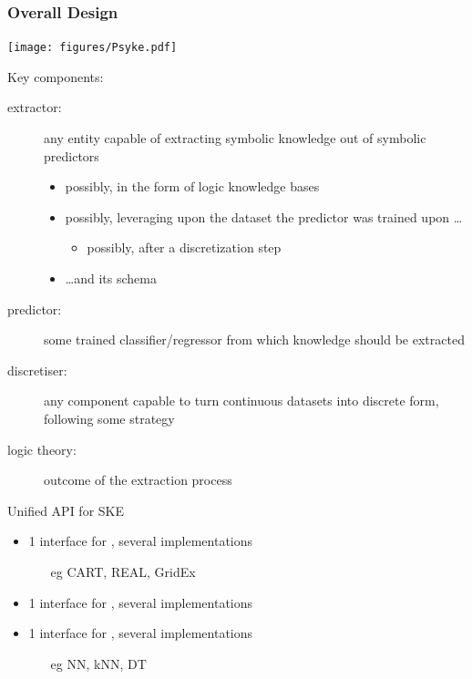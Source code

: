 \documentclass[presentation]{beamer}\mode<presentation>{\usetheme{AMSBolognaFC}}
\begin{document}
\begin{frame}[allowframebreaks]
\frametitle{Overall Design}

    \begin{center}
        \texttt{[image: figures/Psyke.pdf]}
    \end{center}

    \framebreak

    Key components:
    \begin{description}
        \item[extractor:] any entity capable of extracting symbolic knowledge out of symbolic predictors
        \begin{itemize}
            \item possibly, in the form of logic \alert{knowledge bases}
            \item possibly, leveraging upon the \alert{dataset} the predictor was trained upon \ldots
            \begin{itemize}
                \item possibly, after a \alert{discretization} step
            \end{itemize}
            \item \ldots and its \alert{schema}
        \end{itemize}

        \item[predictor:] some trained classifier/regressor from which knowledge should be extracted
        
        \item[discretiser:] any component capable to turn continuous datasets into discrete form, following some strategy
        
        \item[logic theory:] outcome of the extraction process
    \end{description}

    \begin{block}{Unified API for SKE}
        \begin{itemize}
            \item 1 interface for , several implementations
            \begin{itemize}
                \item[eg] CART, REAL, GridEx
            \end{itemize}
            \item 1 interface for , several implementations
            \item 1 interface for , several implementations
            \begin{itemize}
                \item[eg] NN, kNN, DT
            \end{itemize}
        \end{itemize}
    \end{block}
\end{frame}
\end{document}
